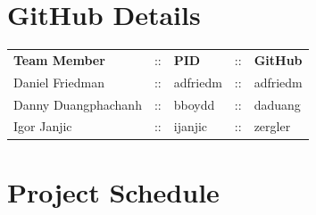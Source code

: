 \section{GitHub Details}
\begin{tabular}{ l c l c l}
    \textbf{Team Member} & :: & \textbf{PID} & :: & \textbf{GitHub} \\
    Daniel Friedman      & :: & adfriedm     & :: & adfriedm        \\
    Danny Duangphachanh  & :: & bboydd       & :: & daduang         \\
    Igor Janjic          & :: & ijanjic      & :: & zergler
\end{tabular}

\section{Project Schedule}



